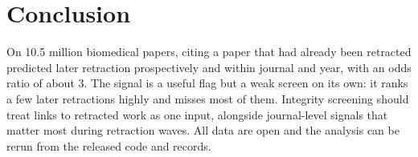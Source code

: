 \section{Conclusion}\label{sec:conclusion}
On 10.5 million biomedical papers, citing a paper that had already been retracted predicted later retraction
prospectively and within journal and year, with an odds ratio of about 3. The signal is a useful flag but a weak
screen on its own: it ranks a few later retractions highly and misses most of them. Integrity screening should treat
links to retracted work as one input, alongside journal-level signals that matter most during retraction waves. All
data are open and the analysis can be rerun from the released code and records.
